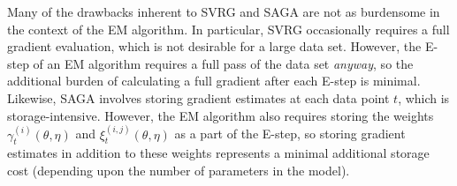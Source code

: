 



Many of the drawbacks inherent to SVRG and SAGA are not as burdensome in the context of the EM algorithm. In particular, SVRG occasionally requires a full gradient evaluation, which is not desirable for a large data set. However, the E-step of an EM algorithm requires a full pass of the data set \textit{anyway}, so the additional burden of calculating a full gradient after each E-step is minimal. Likewise, SAGA involves storing gradient estimates at each data point $t$, which is storage-intensive. However, the EM algorithm also requires storing the weights $\gamma_t^{(i)}(\theta, \eta)$ and $\xi_t^{(i,j)}(\theta, \eta)$ as a part of the E-step, so storing gradient estimates in addition to these weights represents a minimal additional storage cost (depending upon the number of parameters in the model).

